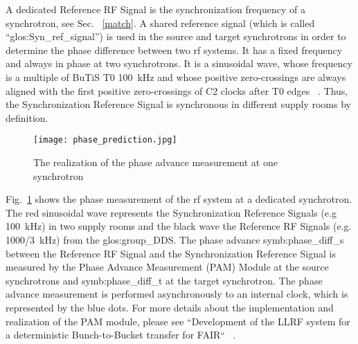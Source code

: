 A dedicated Reference RF Signal is the synchronization frequency of a synchrotron, see Sec. ~\ref{match}. A shared reference signal (which is called “\gls{glos:Syn_ref_signal}”) is used in the source and target synchrotrons in order to determine the phase difference between two rf systems. It has a fixed frequency and always in phase at two synchrotrons. It is a sinusoidal wave, whose frequency is a multiple of BuTiS T0 \SI{100}{kHz} and whose positive zero-crossings are always aligned with the first positive zero-crossings of C2 clocks after T0 edges ~\cite{ferrand_system_2014, ferrand_system_2015}. Thus, the Synchronization Reference Signal is synchronous in different supply rooms by definition.

\begin{figure}[H]
   \centering   
   \texttt{[image: phase\_prediction.jpg]}
   \caption{The realization of the phase advance measurement at one synchrotron}
   \label{phase_prediction}
\end{figure}

Fig.~\ref{phase_prediction} shows the phase measurement of the rf system at a dedicated synchrotron. The red sinusoidal wave represents the Synchronization Reference Signals (e.g \SI{100}{kHz}) in two supply rooms and the black wave the Reference RF Signals (e.g. \SI{1000/3}{kHz}) from the \gls{glos:group_DDS}. The phase advance \gls{symb:phase_diff_s} between the Reference RF Signal and the Synchronization Reference Signal is measured by the Phase Advance Measurement (\gls{PAM}) Module at the source synchrotrons and \gls{symb:phase_diff_t} at the target synchrotron. The phase advance measurement is performed asynchronously to an internal clock, which is represented by the blue dots. For more details about the implementation and realization of the PAM module, please see ``Development of the LLRF system for a deterministic Bunch-to-Bucket transfer for FAIR`` ~\cite{ferrand_development_????}. 
